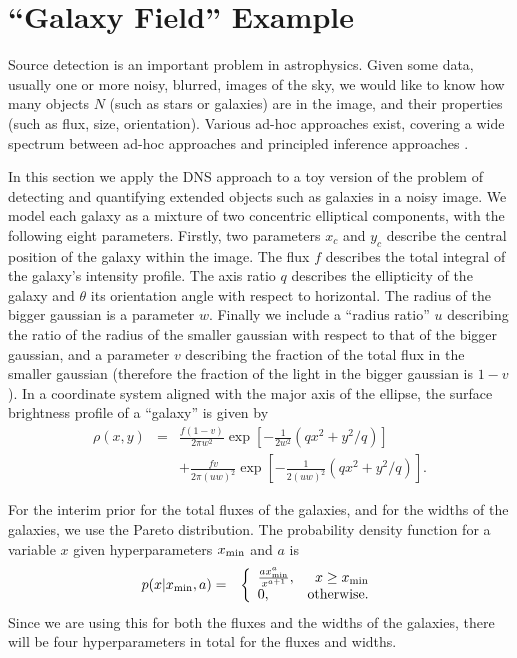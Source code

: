 \documentclass[letterpaper, 11pt]{article}
\begin{document}
\section{``Galaxy Field'' Example}
Source detection is an important problem in astrophysics. Given some data,
usually one or more noisy, blurred, images of the sky, we would like to know
how many objects $N$ (such as stars or galaxies) are in the image, and their
properties (such as flux, size, orientation). Various ad-hoc approaches exist,
covering a wide spectrum between ad-hoc approaches and principled inference
approaches
\citep[e.g.][]{irwin, sextractor, dolphot, 2003MNRAS.338..765H, starfield}.

In this section we apply
the DNS approach to a toy version of the problem of detecting and quantifying
extended objects such as galaxies in a noisy image.
We model each galaxy as a mixture of two concentric elliptical components, with
the following eight parameters. Firstly, two
parameters $x_c$ and $y_c$ describe the central position of the galaxy within
the image. The flux $f$ describes the total integral of the galaxy's
intensity profile. The axis ratio $q$ describes the ellipticity of the galaxy
and $\theta$ its orientation angle with respect to horizontal. The radius of the
bigger gaussian is a parameter $w$.
Finally
we include a ``radius ratio'' $u$ describing the ratio of the radius of the
smaller gaussian with respect to that of the bigger gaussian, and a parameter
$v$ describing the fraction of the total flux in the smaller gaussian
(therefore the fraction of the light in the bigger gaussian is $1-v$).
In a coordinate system aligned with the major axis of the ellipse, the
surface brightness profile of a ``galaxy'' is given by
\begin{eqnarray}
\rho(x, y) &=&
\frac{f(1-v)}{2\pi w^2}\exp\left[-\frac{1}{2w^2}\left(qx^2 + y^2/q\right)\right]\\
&&+\frac{fv}{2\pi (uw)^2}\exp\left[-\frac{1}{2(uw)^2}\left(qx^2 + y^2/q\right)\right].
\end{eqnarray}

For the interim prior for the total fluxes of the galaxies, and for the
widths of the galaxies, we use the Pareto
distribution. The probability density function for a variable $x$ given
hyperparameters $x_{\rm min}$ and $a$ is
\begin{eqnarray}
p(x | x_{\rm min}, a) &=&
\left\{
\begin{array}{lr}
\frac{a x_{\rm min}^{a}}{x^{a + 1}}, & x \geq x_{\rm min}\\
0, & \textnormal{otherwise.}
\end{array}
\right.
\end{eqnarray}
Since we are using this for both the fluxes and the widths of the galaxies,
there will be four hyperparameters in total for the fluxes and widths.
\end{document}
